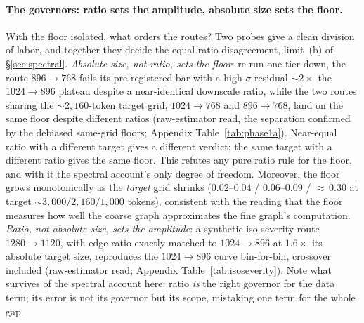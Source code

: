 \paragraph{The governors: ratio sets the amplitude, absolute size sets
the floor.}
With the floor isolated, what orders the routes? Two probes give a
clean division of labor, and together they decide the equal-ratio
disagreement, limit~(b) of \S\ref{sec:spectral}. \emph{Absolute
size, not ratio, sets the floor}: re-run one tier down, the route
$896{\to}768$ fails its pre-registered bar with a high-$\sigma$
residual ${\sim}2\times$ the $1024{\to}896$ plateau despite a
near-identical downscale ratio, while the two routes sharing the
${\sim}2{,}160$-token target grid, $1024{\to}768$ and $896{\to}768$,
land on the same floor despite different ratios (raw-estimator read,
the separation confirmed by the debiased same-grid floors; Appendix
Table~\ref{tab:phase1a}). Near-equal ratio with a different target
gives a different verdict; the same target with a different ratio
gives the same floor. This refutes any pure ratio rule for the floor,
and with it the spectral account's only degree of freedom. Moreover,
the floor grows monotonically as the \emph{target} grid shrinks
($0.02$--$0.04$ / $0.06$--$0.09$ / ${\approx}\,0.30$ at target
${\sim}3{,}000/2{,}160/1{,}000$ tokens), consistent with the reading
that the floor measures how well the coarse graph approximates the
fine graph's computation.
\emph{Ratio, not absolute size, sets the amplitude}: a synthetic
iso-severity route $1280{\to}1120$, with edge ratio exactly matched to
$1024{\to}896$ at $1.6\times$ its absolute target size, reproduces
the $1024{\to}896$ curve bin-for-bin, crossover included
(raw-estimator read; Appendix Table~\ref{tab:isoseverity}). Note what survives of
the spectral account here: ratio \emph{is} the right governor for the
data term; its error is not its governor but its scope, mistaking one
term for the whole gap.

